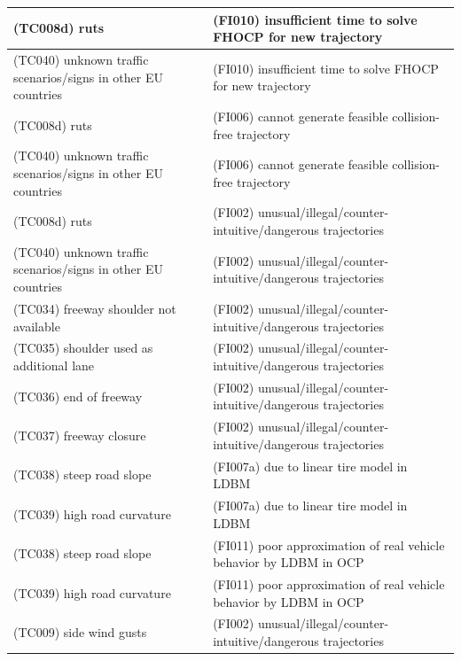 \documentclass{article}
\begin{document}
\begin{longtable}{|p{8cm}|p{8cm}|}
\cellcolor{cRed}(TC008d) ruts& \cellcolor{cBlue}(FI010) insufficient time to solve FHOCP for new trajectory\\\hline
\cellcolor{cYellow}(TC040) unknown traffic scenarios/signs in other EU countries& \cellcolor{cBlue}(FI010) insufficient time to solve FHOCP for new trajectory\\\hline
\cellcolor{cRed}(TC008d) ruts& \cellcolor{cBlue}(FI006) cannot generate feasible collision-free trajectory\\\hline
\cellcolor{cYellow}(TC040) unknown traffic scenarios/signs in other EU countries& \cellcolor{cBlue}(FI006) cannot generate feasible collision-free trajectory\\\hline
\cellcolor{cRed}(TC008d) ruts& \cellcolor{cBlue}(FI002) unusual/illegal/counter-intuitive/dangerous trajectories\\\hline
\cellcolor{cYellow}(TC040) unknown traffic scenarios/signs in other EU countries& \cellcolor{cBlue}(FI002) unusual/illegal/counter-intuitive/dangerous trajectories\\\hline
\cellcolor{cYellow}(TC034) freeway shoulder not available& \cellcolor{cBlue}(FI002) unusual/illegal/counter-intuitive/dangerous trajectories\\\hline
\cellcolor{cYellow}(TC035) shoulder used as additional lane& \cellcolor{cBlue}(FI002) unusual/illegal/counter-intuitive/dangerous trajectories\\\hline
\cellcolor{cYellow}(TC036) end of freeway& \cellcolor{cBlue}(FI002) unusual/illegal/counter-intuitive/dangerous trajectories\\\hline
\cellcolor{cYellow}(TC037) freeway closure& \cellcolor{cBlue}(FI002) unusual/illegal/counter-intuitive/dangerous trajectories\\\hline
\cellcolor{cViolet}(TC038) steep road slope& \cellcolor{cBlue}(FI007a) due to linear tire model in LDBM\\\hline
\cellcolor{cViolet}(TC039) high road curvature& \cellcolor{cBlue}(FI007a) due to linear tire model in LDBM\\\hline
\cellcolor{cViolet}(TC038) steep road slope& \cellcolor{cBlue}(FI011) poor approximation of real vehicle behavior by LDBM in OCP\\\hline
\cellcolor{cViolet}(TC039) high road curvature& \cellcolor{cBlue}(FI011) poor approximation of real vehicle behavior by LDBM in OCP\\\hline
\cellcolor{cRed}(TC009) side wind gusts& \cellcolor{cBlue}(FI002) unusual/illegal/counter-intuitive/dangerous trajectories\\\hline

\end{longtable}
\end{document}
